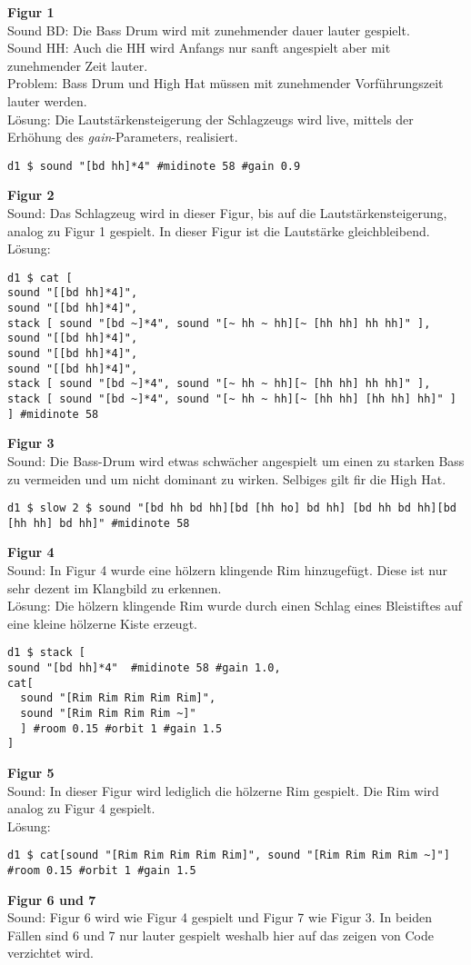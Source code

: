 \documentclass[
10pt, %
a4paper, %
oneside, %
headinclude,footinclude, %
BCOR5mm, %
]{scrartcl}
\begin{document}
\noindent \textbf{Figur 1}\\
Sound BD: Die Bass Drum wird mit zunehmender dauer lauter gespielt.\\
Sound HH: Auch die HH wird Anfangs nur sanft angespielt aber mit zunehmender Zeit lauter.\\
Problem: Bass Drum und High Hat müssen mit zunehmender Vorführungszeit lauter werden.\\ 
Lösung: Die Lautstärkensteigerung der Schlagzeugs wird live, mittels der Erhöhung des \textit{gain}-Parameters, realisiert.
\begin{lstlisting}
d1 $ sound "[bd hh]*4" #midinote 58 #gain 0.9
\end{lstlisting}
\noindent \textbf{Figur 2}\\
Sound: Das Schlagzeug wird in dieser Figur, bis auf die Lautstärkensteigerung, analog zu Figur 1 gespielt. In dieser Figur ist die Lautstärke gleichbleibend.\\
Lösung:
\begin{lstlisting}
d1 $ cat [
sound "[[bd hh]*4]",
sound "[[bd hh]*4]",
stack [ sound "[bd ~]*4", sound "[~ hh ~ hh][~ [hh hh] hh hh]" ],
sound "[[bd hh]*4]",
sound "[[bd hh]*4]",
sound "[[bd hh]*4]",
stack [ sound "[bd ~]*4", sound "[~ hh ~ hh][~ [hh hh] hh hh]" ],
stack [ sound "[bd ~]*4", sound "[~ hh ~ hh][~ [hh hh] [hh hh] hh]" ]
] #midinote 58
\end{lstlisting}
\noindent \textbf{Figur 3}\\
Sound: Die Bass-Drum wird etwas schwächer angespielt um einen zu starken Bass zu vermeiden und um nicht dominant zu wirken. Selbiges gilt fir die High Hat.
\begin{lstlisting}
d1 $ slow 2 $ sound "[bd hh bd hh][bd [hh ho] bd hh] [bd hh bd hh][bd [hh hh] bd hh]" #midinote 58
\end{lstlisting}
\noindent \textbf{Figur 4}\\
Sound: In Figur 4 wurde eine hölzern klingende Rim hinzugefügt. Diese ist nur sehr dezent im Klangbild zu erkennen.\\
Lösung: Die hölzern klingende Rim wurde durch einen Schlag eines Bleistiftes auf eine kleine hölzerne Kiste erzeugt.
 \begin{lstlisting}
d1 $ stack [
sound "[bd hh]*4"  #midinote 58 #gain 1.0,
cat[
  sound "[Rim Rim Rim Rim Rim]",
  sound "[Rim Rim Rim Rim ~]"
  ] #room 0.15 #orbit 1 #gain 1.5
]
\end{lstlisting}
\noindent \textbf{Figur 5}\\
Sound: In dieser Figur wird lediglich die hölzerne Rim gespielt. Die Rim wird analog zu Figur 4 gespielt.\\
Lösung:
\begin{lstlisting}
d1 $ cat[sound "[Rim Rim Rim Rim Rim]", sound "[Rim Rim Rim Rim ~]"] #room 0.15 #orbit 1 #gain 1.5
\end{lstlisting}
\noindent \textbf{Figur 6 und 7}\\
Sound: Figur 6 wird wie Figur 4 gespielt und Figur 7 wie Figur 3. In beiden Fällen sind 6 und 7 nur lauter gespielt weshalb hier auf das zeigen von Code verzichtet wird.\\
\end{document}
